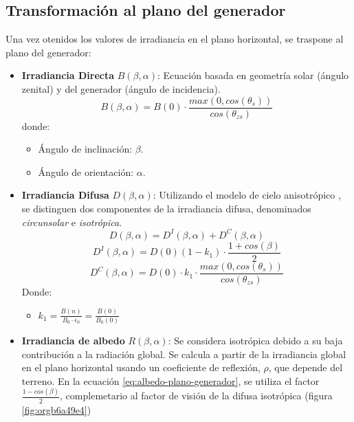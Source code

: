 \subsection{Transformación al plano del generador}
\label{sec:orga1fbc26}
\label{subsec:transformación-plano-generador}
Una vez otenidos los valores de irradiancia en el plano horizontal, se traspone al plano del generador:
\begin{itemize}
\item \textbf{Irradiancia Directa} \(B(\beta ,\alpha)\): Ecuación basada en geometría solar (ángulo zenital) y del generador (ángulo de incidencia).
\begin{equation}
B(\beta ,\alpha)=B(0)\cdot \frac{max(0,cos(\theta_s))}{cos(\theta_{zs})}
\label{eq:irradiancia-directa-plano-generador}
\end{equation}
donde:
\begin{itemize}
\item Ángulo de inclinación: \(\beta\).
\item Ángulo de orientación: \(\alpha\). 
\end{itemize}
\item \textbf{Irradiancia Difusa} \(D(\beta ,\alpha)\): Utilizando el modelo de cielo anisotrópico \cite{Perpinan2023}, se distinguen dos componentes de la irradiancia difusa, denominados \emph{circunsolar} e \emph{isotrópica}.  
\begin{equation}
D(\beta ,\alpha)=D^I(\beta ,\alpha)+D^C(\beta ,\alpha)
\end{equation}
\begin{equation}
D^I(\beta ,\alpha)=D(0)(1-k_1)\cdot \frac{1+cos(\beta)}{2}
\end{equation}
\begin{equation}
D^C(\beta, \alpha)=D(0)\cdot k_1\cdot \frac{max(0,cos(\theta_s))}{cos(\theta_{zs})}
\end{equation}
Donde:
\begin{itemize}
\item \(k_1=\frac{B(n)}{B_0\cdot \epsilon_0}=\frac{B(0)}{B_0(0)}\)
\end{itemize}
\item \textbf{Irradiancia de albedo} \(R(\beta ,\alpha)\): Se considera isotrópica debido a su baja contribución a la radiación global. Se calcula a partir de la irradiancia global en el plano horizontal usando un coeficiente de reflexión, \(\rho\), que depende del terreno. En la ecuación \ref{eq:albedo-plano-generador}, se utiliza el factor \(\frac{1-cos(\beta)}{2}\), complemetario al factor de visión de la difusa isotrópica (figura \ref{fig:orgb6a49e4})

\end{itemize}
